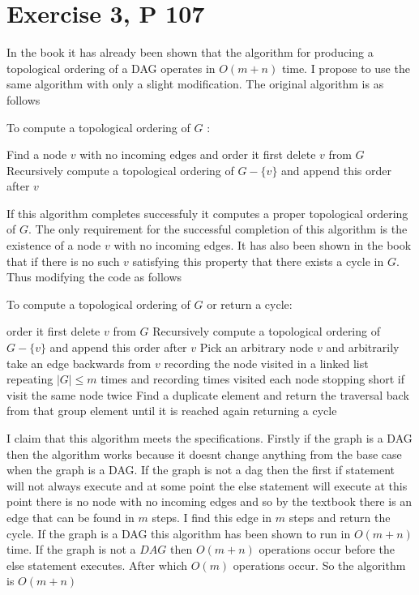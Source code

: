 \documentclass{amsart}
\begin{document}
\section{Exercise 3, P 107}
In the book it has already been shown that the algorithm for producing a topological
ordering of a DAG operates in  $O(m+n)$ time. I propose to use the same algorithm with only a
slight modification. The original algorithm is as follows
\begin{algorithm}
\caption{To compute a topological ordering of $G$ :}
\begin{algorithmic}
    \STATE Find a node $v$ with no incoming edges and order it first
    \STATE delete $v$ from $G$ 
    \STATE Recursively compute a topological ordering of $G-\{v\}$ and
    append this order after  $v$
\end{algorithmic}
\end{algorithm}
If this algorithm completes successfuly it computes a proper topological ordering of $G$.
The only requirement for the successful completion of this algorithm is the existence of a node
$v$ with no incoming edges. It has also been shown in the book that if there is no such $v$ satisfying this property
that there exists a cycle in $G$.  Thus modifying the code as follows
\begin{algorithm}
\caption{To compute a topological ordering of $G$  or return a cycle:}
\begin{algorithmic}
    \STATE order it first
    \STATE delete $v$ from $G$ 
    \STATE Recursively compute a topological ordering of $G-\{v\}$ and
    append this order after  $v$
    \ELSE
        \STATE Pick an arbitrary node $v$ and arbitrarily take an edge backwards from $v$ recording the node visited in a linked list
            repeating $|G| \le m$ times and recording times visited each node stopping short if visit the same node twice
        \STATE Find a duplicate element and return the traversal back from that group element until it is reached again returning a cycle
    \ENDIF
\end{algorithmic}
\end{algorithm}
I claim that this algorithm meets the specifications. Firstly if the graph is a DAG then
the algorithm works because it doesnt change anything from the base case when the graph is a DAG.
If the graph is not a dag then the first if statement will not always execute and at some point the else statement will execute
at this point there is no node with no incoming edges and so by the textbook there is an edge
that can be found in $m$ steps. I find this edge in $m$ steps and return the cycle. If the 
graph is a  DAG this algorithm has been shown to run in $O(m+n)$ time. If the graph is not a $DAG$ 
then $O(m+n)$ operations occur before the else statement executes. After which $O(m)$ operations occur.
So the algorithm is $O(m+n)$
\end{document}
